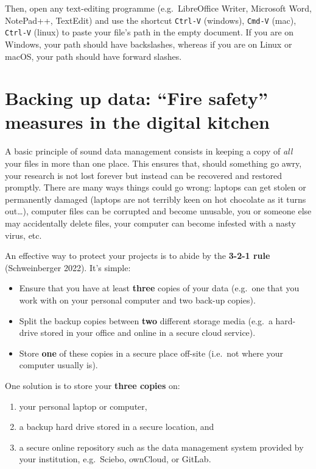 \documentclass[
  letterpaper,
  DIV=11,
  numbers=noendperiod]{scrreprt}
\providecommand{\tightlist}{%
  \setlength{\itemsep}{0pt}\setlength{\parskip}{0pt}}
\begin{document}
Then, open any text-editing programme (e.g.~LibreOffice Writer,
Microsoft Word, NotePad++, TextEdit) and use the shortcut
\texttt{Ctrl-V} (windows), \texttt{Cmd-V} (mac), \texttt{Ctrl-V} (linux)
to paste your file's path in the empty document. If you are on Windows,
your path should have backslashes, whereas if you are on Linux or macOS,
your path should have forward slashes.

\section{\texorpdfstring{Backing up data: ``Fire safety'' measures in
the digital
kitchen~️}{Backing up data: ``Fire safety'' measures in the digital kitchen~️}}\label{sec-BackupData}

A basic principle of sound data management consists in keeping a copy of
\emph{all} your files in more than one place. This ensures that, should
something go awry, your research is not lost forever but instead can be
recovered and restored promptly. There are many ways things could go
wrong: laptops can get stolen or permanently damaged (laptops are not
terribly keen on hot chocolate as it turns out\ldots), computer files
can be corrupted and become unusable, you or someone else may
accidentally delete files, your computer can become infested with a
nasty virus, etc.

An effective way to protect your projects is to abide by the
\textbf{3-2-1 rule} (Schweinberger 2022). It's simple:

\begin{itemize}
\tightlist
\item
  Ensure that you have at least \textbf{three} copies of your data
  (e.g.~one that you work with on your personal computer and two back-up
  copies).
\item
  Split the backup copies between \textbf{two} different storage media
  (e.g.~a hard-drive stored in your office and online in a secure cloud
  service).
\item
  Store \textbf{one} of these copies in a secure place off-site
  (i.e.~not where your computer usually is).
\end{itemize}

One solution is to store your \textbf{three copies} on:

\begin{enumerate}
\def\labelenumi{\arabic{enumi}.}
\tightlist
\item
  your personal laptop or computer,
\item
  a backup hard drive stored in a secure location, and
\item
  a secure online repository such as the data management system provided
  by your institution, e.g.~Sciebo, ownCloud, or GitLab.
\end{enumerate}
\end{document}
